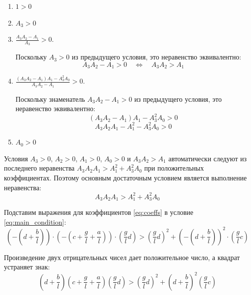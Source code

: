 \documentclass[a4paper, 12pt]{article}
\begin{document}
\begin{enumerate}
    \item \(1 > 0\) 
    
    \item \(A_3 > 0\) 
    
    \item \(\displaystyle \frac{A_3 A_2 - A_1}{A_3} > 0\).
    
    Поскольку \(A_3 > 0\) из предыдущего условия, это неравенство эквивалентно:
    \begin{equation}
    A_3 A_2 - A_1 > 0 \quad \Longleftrightarrow \quad A_3 A_2 > A_1
    \label{eq:cond2}
    \end{equation}
    
    \item \(\displaystyle \frac{(A_3 A_2 - A_1) A_1 - A_3^2 A_0}{A_3 A_2 - A_1} > 0\).
    
    Поскольку знаменатель \(A_3 A_2 - A_1 > 0\) из предыдущего условия, это неравенство эквивалентно:
    \begin{equation}
    (A_3 A_2 - A_1) A_1 - A_3^2 A_0 > 0
    \end{equation}
    \begin{equation}
    A_3 A_2 A_1 - A_1^2 - A_3^2 A_0 > 0
    \label{eq:cond3}
    \end{equation}
    
    \item \(A_0 > 0\) 
\end{enumerate}


Условия \(A_3 > 0\), \(A_2 > 0\), \(A_1 > 0\), \(A_0 > 0\) и \(A_3 A_2 > A_1\) автоматически следуют из последнего неравенства \(A_3 A_2 A_1 > A_1^2 + A_3^2 A_0\) при положительных коэффициентах. Поэтому основным достаточным условием является выполнение неравенства:
\begin{equation}
\boxed{A_3 A_2 A_1 > A_1^2 + A_3^2 A_0}
\label{eq:main_condition}
\end{equation}


Подставим выражения для коэффициентов \eqref{eq:coeffs} в условие \eqref{eq:main_condition}:
\begin{equation}
\left(-\left(d + \frac{b}{l}\right)\right) \cdot \left(-\left(c + \frac{g}{l} + \frac{a}{l}\right)\right) \cdot \left(\frac{g}{l}d\right) > \left(\frac{g}{l}d\right)^2 + \left(-\left(d + \frac{b}{l}\right)\right)^2 \cdot \left(\frac{g}{l}c\right)
\end{equation}

Произведение двух отрицательных чисел дает положительное число, а квадрат устраняет знак:
\begin{equation}
\left(d + \frac{b}{l}\right) \left(c + \frac{g}{l} + \frac{a}{l}\right) \left(\frac{g}{l}d\right) > \left(\frac{g}{l}d\right)^2 + \left(d + \frac{b}{l}\right)^2 \left(\frac{g}{l}c\right)
\end{equation}
\end{document}
